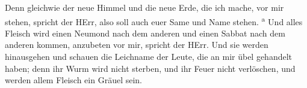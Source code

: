  Denn gleichwie der neue Himmel und die neue Erde, die
ich mache, vor mir stehen, spricht der HErr, also soll auch euer Same
und Name stehen. \textsuperscript{a}  Und alles Fleisch
wird einen Neumond nach dem anderen und einen Sabbat nach dem anderen
kommen, anzubeten vor mir, spricht der HErr.  Und sie
werden hinausgehen und schauen die Leichname der Leute, die an mir übel
gehandelt haben; denn ihr Wurm wird nicht sterben, und ihr Feuer nicht
verlöschen, und werden allem Fleisch ein Gräuel sein.
